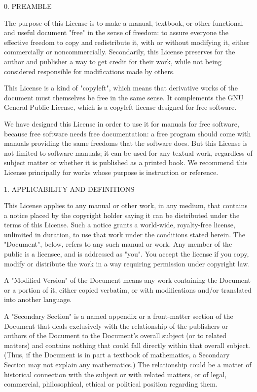 \documentclass[oneside,english,a4paper,10pt,oneside,openany,final]{memoir}
\begin{document}
0. PREAMBLE

The purpose of this License is to make a manual, textbook, or other functional and useful document "free" in the sense of freedom: to assure everyone the effective freedom to copy and redistribute it, with or without modifying it, either commercially or noncommercially. Secondarily, this License preserves for the author and publisher a way to get credit for their work, while not being considered responsible for modifications made by others.

This License is a kind of "copyleft", which means that derivative works of the document must themselves be free in the same sense. It complements the GNU General Public License, which is a copyleft license designed for free software.

We have designed this License in order to use it for manuals for free software, because free software needs free documentation: a free program should come with manuals providing the same freedoms that the software does. But this License is not limited to software manuals; it can be used for any textual work, regardless of subject matter or whether it is published as a printed book. We recommend this License principally for works whose purpose is instruction or reference.

1. APPLICABILITY AND DEFINITIONS

This License applies to any manual or other work, in any medium, that contains a notice placed by the copyright holder saying it can be distributed under the terms of this License. Such a notice grants a world-wide, royalty-free license, unlimited in duration, to use that work under the conditions stated herein. The "Document", below, refers to any such manual or work. Any member of the public is a licensee, and is addressed as "you". You accept the license if you copy, modify or distribute the work in a way requiring permission under copyright law.

A "Modified Version" of the Document means any work containing the Document or a portion of it, either copied verbatim, or with modifications and/or translated into another language.

A "Secondary Section" is a named appendix or a front-matter section of the Document that deals exclusively with the relationship of the publishers or authors of the Document to the Document's overall subject (or to related matters) and contains nothing that could fall directly within that overall subject. (Thus, if the Document is in part a textbook of mathematics, a Secondary Section may not explain any mathematics.) The relationship could be a matter of historical connection with the subject or with related matters, or of legal, commercial, philosophical, ethical or political position regarding them.
\end{document}
